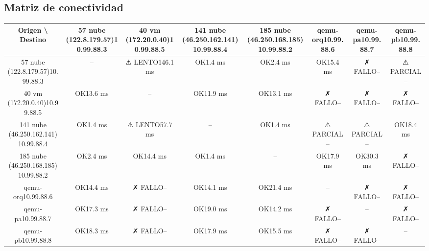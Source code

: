 \documentclass[11pt,a4paper]{article}
\begin{document}
\subsection{Matriz de conectividad}
\begin{longtable}{|c|c|c|c|c|c|c|c|}
\hline
Origen \textbackslash{} Destino & 57 nube (122.8.179.57)10.99.88.3 & 40 vm (172.20.0.40)10.99.88.5 & 141 nube (46.250.162.141)10.99.88.4 & 185 nube (46.250.168.185)10.99.88.2 & qemu-orq10.99.88.6 & qemu-pa10.99.88.7 & qemu-pb10.99.88.8 \\ \hline
57 nube (122.8.179.57)10.99.88.3 & -- & ⚠ LENTO146.1 ms & OK1.4 ms & OK2.4 ms & OK15.4 ms & ✗ FALLO-- & ⚠ PARCIAL-- \\ \hline
40 vm (172.20.0.40)10.99.88.5 & OK13.6 ms & -- & OK11.9 ms & OK13.1 ms & ✗ FALLO-- & ✗ FALLO-- & ✗ FALLO-- \\ \hline
141 nube (46.250.162.141)10.99.88.4 & OK1.4 ms & ⚠ LENTO57.7 ms & -- & OK1.4 ms & ⚠ PARCIAL-- & ⚠ PARCIAL-- & OK18.4 ms \\ \hline
185 nube (46.250.168.185)10.99.88.2 & OK2.4 ms & OK14.4 ms & OK1.4 ms & -- & OK17.9 ms & OK30.3 ms & ✗ FALLO-- \\ \hline
qemu-orq10.99.88.6 & OK14.4 ms & ✗ FALLO-- & OK14.1 ms & OK21.4 ms & -- & ✗ FALLO-- & ✗ FALLO-- \\ \hline
qemu-pa10.99.88.7 & OK17.3 ms & ✗ FALLO-- & OK19.0 ms & OK14.2 ms & ✗ FALLO-- & -- & ✗ FALLO-- \\ \hline
qemu-pb10.99.88.8 & OK18.3 ms & ✗ FALLO-- & OK17.9 ms & OK15.5 ms & ✗ FALLO-- & ✗ FALLO-- & -- \\ \hline
\end{longtable}
\end{document}
